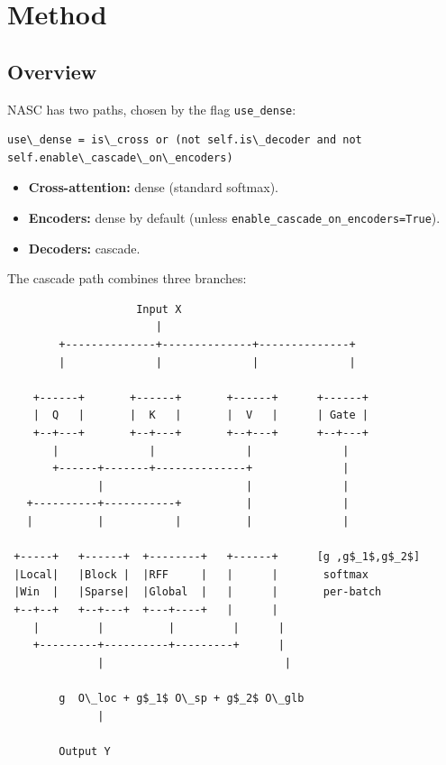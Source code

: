 
\section{Method}

\subsection{Overview}

NASC has two paths, chosen by the flag \texttt{use\_dense}:

\begin{lstlisting}
use\_dense = is\_cross or (not self.is\_decoder and not self.enable\_cascade\_on\_encoders)
\end{lstlisting}

\begin{itemize}
\item \textbf{Cross-attention:} dense (standard softmax).
\item \textbf{Encoders:} dense by default (unless \texttt{enable\_cascade\_on\_encoders=True}).
\item \textbf{Decoders:} cascade.

\end{itemize}
The cascade path combines three branches:

\begin{lstlisting}
                    Input X
                       |
        +--------------+--------------+--------------+
        |              |              |              |
                                                      
    +------+       +------+       +------+      +------+
    |  Q   |       |  K   |       |  V   |      | Gate |
    +--+---+       +--+---+       +--+---+      +--+---+
       |              |              |              |
       +------+-------+--------------+              |
              |                      |              |
   +----------+-----------+          |              |
   |          |           |          |              |
                                                     
 +-----+   +------+  +--------+   +------+      [g ,g$_1$,g$_2$]
 |Local|   |Block |  |RFF     |   |      |       softmax
 |Win  |   |Sparse|  |Global  |   |      |       per-batch
 +--+--+   +--+---+  +---+----+   |      |
    |         |          |         |      |
    +---------+----------+---------+      |
              |                            |
                                            
        g  O\_loc + g$_1$ O\_sp + g$_2$ O\_glb
              |
               
        Output Y
\end{lstlisting}

